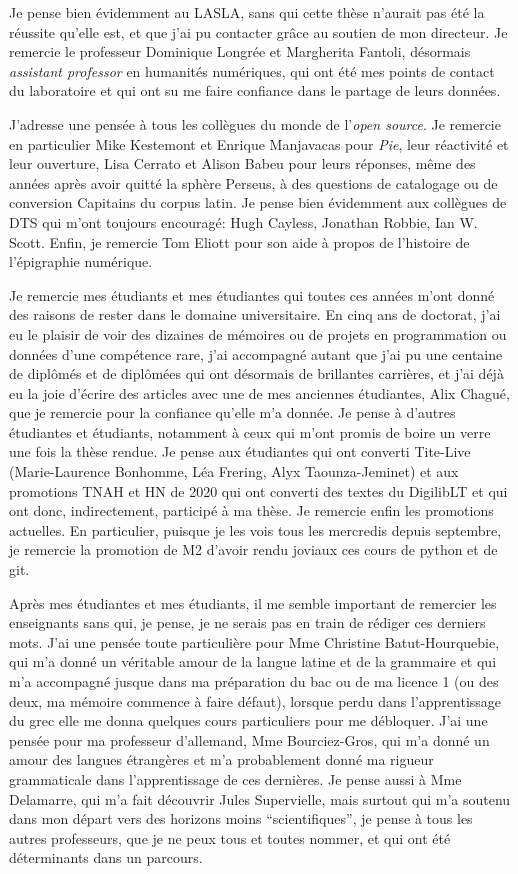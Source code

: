 Je pense bien évidemment au LASLA, sans qui cette thèse n'aurait pas été la réussite qu'elle est, et que j'ai pu contacter grâce au soutien de mon directeur. Je remercie le professeur Dominique Longrée et 
Margherita Fantoli, désormais \textit{assistant professor} en humanités numériques, qui ont été mes points de contact du laboratoire et qui ont su me faire confiance dans le partage de leurs données.

J'adresse une pensée à tous les collègues du monde de l'\textit{open source}. Je remercie en particulier Mike Kestemont et Enrique Manjavacas pour \textit{Pie}, leur réactivité et leur ouverture, Lisa Cerrato et Alison Babeu pour leurs réponses, même des années après avoir quitté la sphère Perseus, à des questions de catalogage ou de conversion Capitains du corpus latin. Je pense bien évidemment aux collègues de DTS qui m'ont toujours encouragé: Hugh Cayless, Jonathan Robbie, Ian W. Scott. Enfin, je remercie Tom Eliott pour son aide à propos de l'histoire de l'épigraphie numérique. 

Je remercie mes étudiants et mes étudiantes qui toutes ces années m'ont donné des raisons de rester dans le domaine universitaire. En cinq ans de doctorat, j'ai eu le plaisir de voir des dizaines de mémoires ou de projets en programmation ou données d'une compétence rare, j'ai accompagné autant que j'ai pu une centaine de diplômés et de diplômées qui ont désormais de brillantes carrières, et j'ai déjà eu la joie d'écrire des articles avec une de mes anciennes étudiantes, Alix Chagué, que je remercie pour la confiance qu'elle m'a donnée. Je pense à d'autres étudiantes et étudiants, notamment à ceux qui m'ont promis de boire un verre une fois la thèse rendue. Je pense aux étudiantes qui ont converti Tite-Live (Marie-Laurence Bonhomme, Léa Frering, Alyx Taounza-Jeminet) et aux promotions TNAH et HN de 2020 qui ont converti des textes du DigilibLT et qui ont donc, indirectement, participé à ma thèse. Je remercie enfin les promotions actuelles. En particulier, puisque je les vois tous les mercredis depuis septembre, je remercie la promotion de M2 d'avoir rendu joviaux ces cours de python et de git.

Après mes étudiantes et mes étudiants, il me semble important de remercier les enseignants sans qui, je pense, je ne serais pas en train de rédiger ces derniers mots. J'ai une pensée toute particulière pour Mme Christine Batut-Hourquebie, qui m'a donné un véritable amour de la langue latine et de la grammaire et qui m'a accompagné jusque dans ma préparation du bac ou de ma licence 1 (ou des deux, ma mémoire commence à faire défaut), lorsque perdu dans l'apprentissage du grec elle me donna quelques cours particuliers pour me débloquer. J'ai une pensée pour ma professeur d'allemand, Mme Bourciez-Gros, qui m'a donné un amour des langues étrangères et m'a probablement donné ma rigueur grammaticale dans l'apprentissage de ces dernières. Je pense aussi à Mme Delamarre, qui m'a fait découvrir Jules Supervielle, mais surtout qui m'a soutenu dans mon départ vers des horizons moins \enquote{scientifiques}, je pense à tous les autres professeurs, que je ne peux tous et toutes nommer, et qui ont été déterminants dans un parcours.

